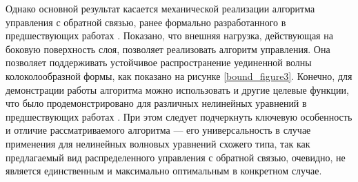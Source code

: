 Однако основной результат касается механической реализации алгоритма управления с обратной связью, ранее формально разработанного в предшествующих работах \cite{bound_horizont, bound_fradkov, porant16, bound_porandr17, porant17}. Показано, что внешняя нагрузка, действующая на боковую поверхность слоя, позволяет реализовать алгоритм управления. Она позволяет поддерживать устойчивое распространение уединенной волны колоколообразной формы, как показано на рисунке \ref{bound_figure3}. Конечно, для демонстрации работы алгоритма можно использовать и другие целевые функции, что было продемонстрировано для различных нелинейных уравнений в предшествующих работах \cite{porant16, bound_porandr17, porant17}. При этом следует подчеркнуть ключевую особенность и отличие рассматриваемого алгоритма --- его универсальность в случае применения для нелинейных волновых уравнений схожего типа, так как предлагаемый вид распределенного управления с обратной связью, очевидно, не является единственным и максимально оптимальным в конкретном случае.